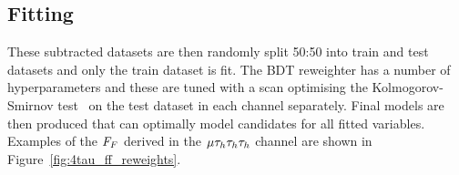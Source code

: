 \subsection{Fitting}

These subtracted datasets are then randomly split 50:50 into train and test datasets and only the train dataset is fit. 
The \ac{BDT} reweighter has a number of hyperparameters and these are tuned with a scan optimising the Kolmogorov-Smirnov test~\cite{16e7f618-c06b-3d10-8705-1086b218d827} on the test dataset in each channel separately.
Final models are then produced that can optimally model \jtth candidates for all fitted variables. 
Examples of the $F_{F}$ derived in the $\mu\tau_{h}\tau_{h}\tau_{h}$ channel are shown in Figure~\ref{fig:4tau_ff_reweights}. \\

\begin{figure}[!hbtp]
\centering
     \\

\end{figure}
